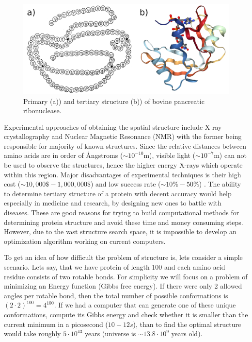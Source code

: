 \begin{figure}[b!]
    \centering
    \includegraphics[width=\linewidth]{imgs_tomas/primary_tertiary.png}
    \caption{Primary (a)) \cite{anfinsen} and tertiary structure (b)) \cite{pdb} of bovine pancreatic ribonuclease.}
    \label{fig:primarytertiary}
\end{figure}

Experimental approaches of obtaining the spatial structure include X-ray crystallography and Nuclear Magnetic Resonance (NMR) with the former being responsible for majority of known structures. 
Since the relative distances between amino acids are in order of \AA ngstroms ($\sim10^{-10}$m), visible light ($\sim10^{-7}$m) can not be used to observe the structures, hence the higher energy X-rays which operate within this region. 
Major disadvantages of experimental techniques is their high cost ($\sim 10,000\mathdollar-1,000,000\mathdollar$) and low success rate ($\sim 10\%-50\%$) \cite{protcost}.
The ability to determine tertiary structure of a protein with decent accuracy would help especially in medicine and research, by designing new ones to battle with diseases.
These are good reasons for trying to build computational methods for determining protein structure and avoid these time and money consuming steps.
However, due to the vast structure search space, it is impossible to develop an optimization algorithm working on current computers.

To get an idea of how difficult the problem of structure is, lets consider a simple scenario. 
Lets say, that we have protein of length 100 and each amino acid residue consists of two rotable bonds. For simplicity we will focus on a problem of minimizing an Energy function (Gibbs free energy).
If there were only 2 allowed angles per rotable bond, then the total number of possible conformations is $(2\cdot2)^{100} = 4^{100}$. 
If we had a computer that can generate one of these unique conformations, compute its Gibbs energy and check whether it is smaller than the current minimum in a picosecond ($10-{12} s$), than to find the optimal structure would take roughly $5 \cdot 10^{43}$ years (universe is $\sim 13.8\cdot10^9$ years old).

